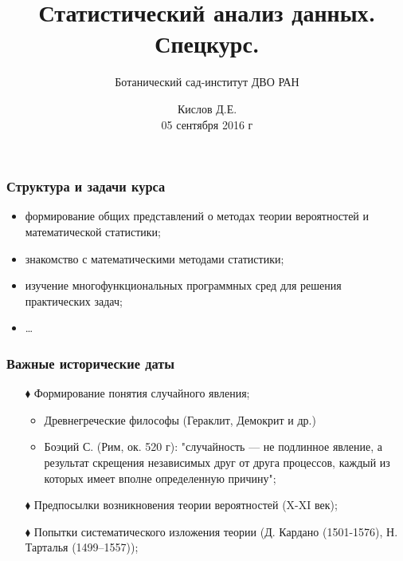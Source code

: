 \documentclass[fullscreen=true]{beamer}
\begin{document}
\title{Статистический анализ данных. Спецкурс.}
\author{Ботанический сад-институт ДВО РАН}%
\date{Кислов Д.Е. \\ 05 сентября 2016 г}
\maketitle


\begin{frame}
\frametitle{Структура и задачи курса}
\begin{itemize}
\item формирование общих представлений о методах теории вероятностей и
математической статистики;
\item знакомство с математическими методами статистики;
\item изучение многофункциональных программных сред для решения практических
задач;
\item \ldots
\end{itemize}
\end{frame}

\begin{frame}
\frametitle{Важные исторические даты}

\begin{itemize}

\item[$\blacklozenge$] Формирование понятия случайного
явления;\newline
        \begin{itemize}
        \item Древнегреческие философы (Гераклит, Демокрит и др.)
        \item Боэций С. (Рим, ок. 520 г):  \newline
        "случайность --- не подлинное явление, а результат скрещения независимых друг
        от друга процессов, каждый из которых имеет вполне определенную
        причину";
        \end{itemize}

\item[$\blacklozenge$] Предпосылки возникновения теории вероятностей (X-XI век);

\item[$\blacklozenge$] Попытки систематического изложения теории
                    (Д. Кардано (1501-1576), Н. Тарталья (1499--1557));
\end{itemize}
\end{frame}
\end{document}
